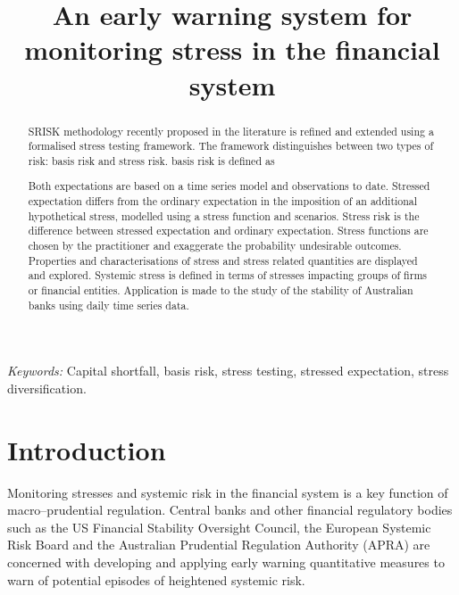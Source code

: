 \documentclass[authoryear]{elsarticle}
\begin{document}
\title{An early warning system for monitoring  stress in the financial system}


\begin{abstract}
SRISK methodology recently proposed in the literature is refined and extended using a formalised stress testing framework.  The framework distinguishes between two types of risk:  basis risk and stress risk.
basis risk is defined as 

 Both expectations are  based on a time series model and  observations to date.   Stressed expectation differs from the ordinary expectation in the imposition of an additional hypothetical  stress, modelled using a stress function and scenarios.  Stress risk is the difference between stressed expectation and ordinary expectation.  Stress functions are chosen by the practitioner and  exaggerate the probability undesirable  outcomes.    Properties and characterisations of stress and stress related quantities are displayed and explored.  Systemic stress is defined in terms of stresses   impacting groups of firms or financial entities.    Application is made to the study of the stability of Australian banks using daily time series data.
\end{abstract}

\date{}
\maketitle
\noindent
{\it Keywords:}  Capital shortfall, basis risk, stress testing,  stressed expectation, stress diversification.


\newpage

\section{Introduction}\label{intro}
Monitoring stresses and systemic risk in the financial system is a key function of macro--prudential regulation. Central banks and other financial regulatory bodies such as the US Financial Stability Oversight Council, the European Systemic Risk Board and the Australian Prudential Regulation Authority (APRA) are concerned with developing and applying early warning quantitative  measures  to warn of potential episodes of heightened systemic risk. 
\end{document}
